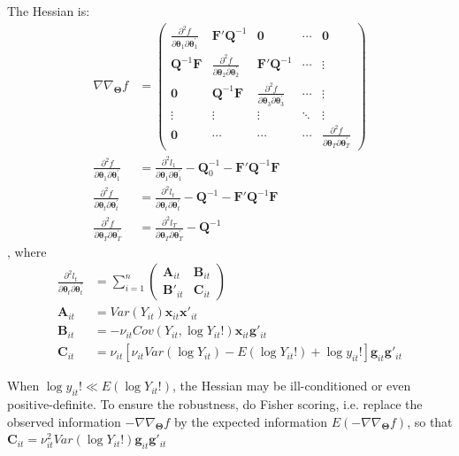 \documentclass[aoas]{imsart}
\theoremstyle{plain}
\theoremstyle{remark}
\begin{document}
\begin{appendix}
The Hessian is:
\begin{align}
	\nabla\nabla_{\bm{\Theta}}f &=
	\begin{pmatrix}
		\frac{\partial^{2}f}{\partial\bm{\theta}_{1}\partial\bm{\theta}_{1}^{'}} & \bm{F}'\bm{Q}^{-1} &\bm{0} & \cdots & \bm{0} \\
		\bm{Q}^{- 1}\bm{F} & \frac{\partial^{2}f}{\partial\bm{\theta}_{2}\partial\bm{\theta}_{2}^{'}}&\bm{F}'\bm{Q}^{-1} & \cdots & \vdots \\
		\bm{0} & \bm{Q}^{-1}\bm{F}  & \frac{\partial^{2}f}{\partial\bm{\theta}_{3}\partial\bm{\theta}_{3}^{'}} & \cdots & \vdots\\
		\vdots & \vdots & \vdots & \ddots & \vdots \\
		\bm{0} & \cdots & \cdots & \cdots & \frac{\partial^{2}f}{\partial\bm{\theta}_{T}\partial\bm{\theta}_{T}^{'}}
	\end{pmatrix}\\
\frac{\partial^{2}f}{\partial\bm{\theta}_{1}\partial\bm{\theta}_{1}^{'}}  &= \frac{\partial^{2}l_1}{\partial\bm{\theta}_{1}\partial\bm{\theta}_{1}^{'}} - \bm{Q}_0^{-1} - \bm{F}'\bm{Q}^{-1}\bm{F} \nonumber\\
\frac{\partial^{2}f}{\partial\bm{\theta}_{t}\partial\bm{\theta}_{t}^{'}}  &= \frac{\partial^{2}l_t}{\partial\bm{\theta}_{t}\partial\bm{\theta}_{t}^{'}} - \bm{Q}^{-1} - \bm{F}'\bm{Q}^{-1}\bm{F} \nonumber\\
\frac{\partial^{2}f}{\partial\bm{\theta}_{T}\partial\bm{\theta}_{T}^{'}}  &= \frac{\partial^{2}l_T}{\partial\bm{\theta}_{T}\partial\bm{\theta}_{T}^{'}} - \bm{Q}^{-1} \nonumber
\end{align}
, where
\begin{align}
	\frac{\partial^{2}l_t}{\partial\bm{\theta}_{t}\partial\bm{\theta}_{t}^{'}} &= \sum_{i = 1}^{n}\begin{pmatrix}
		\bm{A}_{it} & \bm{B}_{it}\\
		\bm{B}'_{it} & \bm{C}_{it}
	\end{pmatrix}\\
\bm{A}_{it} &= Var(Y_{it})\bm{x}_{it}\bm{x}'_{it} \nonumber\\
\bm{B}_{it} &= -\nu_{it}Cov(Y_{it}, \log Y_{it}!)\bm{x}_{it}\bm{g}'_{it} \nonumber\\
\bm{C}_{it} &= \nu_{it}[\nu_{it}Var(\log Y_{it}) - E(\log Y_{it}!) + \log y_{it}!]\bm{g}_{it}\bm{g}'_{it} \nonumber
\end{align}

When $\log y_{it}! \ll E(\log Y_{it}!)$, the Hessian may be ill-conditioned or even positive-definite. To ensure the robustness, do Fisher scoring, i.e. replace the observed information $-\nabla\nabla_{\bm{\Theta}}f$ by the expected information $E(-\nabla\nabla_{\bm{\Theta}}f)$, so that $\bm{C}_{it} = \nu_{it}^2Var(\log Y_{it}!)\bm{g}_{it}\bm{g}'_{it}$
\end{appendix}
\end{document}
